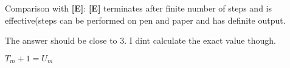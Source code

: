 \documentclass[24pt]{article}
\begin{document}
\begin{enumerate}
\begin{item}
\begin{itemize}
    Comparison with {\bf[E]}:
    {\bf[E]} terminates after finite number of steps and is effective(steps can be performed on pen and paper and has definite output.
  \end{itemize}
\end{item}

\begin{item}

 The answer should be close to 3. I dint calculate the exact value though.
  
\end{item}

\begin{item}

  $T_{m} +1 = U_{m}$

\end{item}


\end{enumerate}
\end{document}
